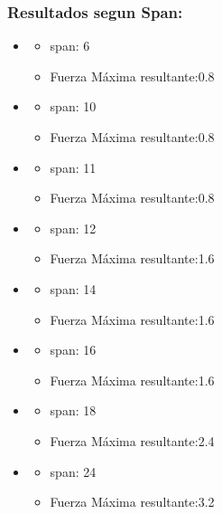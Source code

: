 \subsubsection{Resultados segun Span:}
  \begin{itemize}
   \item 
      \begin{itemize}
	\item span: 6
	\item Fuerza M\'axima resultante:0.8
      \end{itemize}
   \item 
      \begin{itemize}
	\item span: 10
	\item Fuerza M\'axima resultante:0.8
      \end{itemize}
   \item 
      \begin{itemize}
	\item span: 11
	\item Fuerza M\'axima resultante:0.8
      \end{itemize}
   \item 
      \begin{itemize}
	\item span: 12
	\item Fuerza M\'axima resultante:1.6
      \end{itemize}
   \item 
      \begin{itemize}
	\item span: 14
	\item Fuerza M\'axima resultante:1.6
      \end{itemize}
   \item 
      \begin{itemize}
	\item span: 16
	\item Fuerza M\'axima resultante:1.6
      \end{itemize}
   \item 
      \begin{itemize}
	\item span: 18
	\item Fuerza M\'axima resultante:2.4
      \end{itemize}
   \item 
      \begin{itemize}
	\item span: 24
	\item Fuerza M\'axima resultante:3.2
      \end{itemize}
  \end{itemize}
